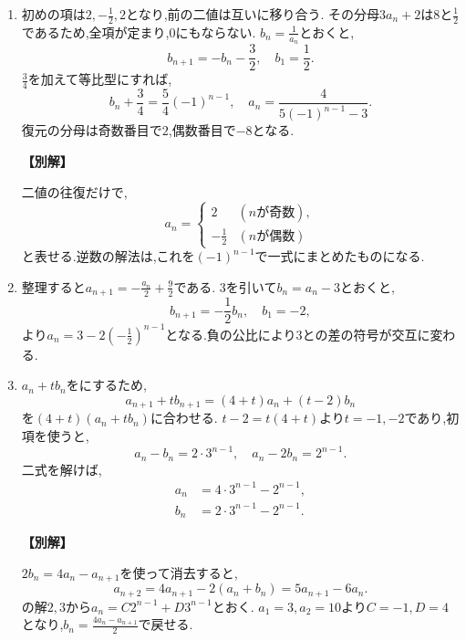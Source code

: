 \begin{enumerate}[label=\textbf{問\arabic*.},leftmargin=3.8em,format=\bookitemlink{practice-basic}{solution}{problem}]
  \item {}\BookMathLayout{}{\\}
    初めの項は$2,-\frac{1}{2},2$となり,前の二値は互いに移り合う.
    その分母$3a_n+2$は$8$と$\frac{1}{2}$であるため,全項が定まり,$0$にもならない.
    $b_n=\frac{1}{a_n}$とおくと,
    \[
      b_{n+1}=-b_n-\frac32,\quad b_1=\frac12.
    \]
    $\frac{3}{4}$を加えて等比型にすれば,
    \[
      b_n+\frac34=\frac54(-1)^{n-1},\quad
      a_n=\frac4{5(-1)^{n-1}-3}.
    \]
    復元の分母は奇数番目で$2$,偶数番目で$-8$となる.
    \par\smallskip\noindent\textbf{【別解】}\par
    二値の往復だけで,
    \[
      a_n=\begin{cases}
        2&(n\text{が奇数}),\\
        -\frac{1}{2}&(n\text{が偶数})
      \end{cases}
    \]
    と表せる.逆数の解法は,これを$(-1)^{n-1}$で一式にまとめたものになる.

  \item {}\BookMathLayout{}{\\}
    整理すると$a_{n+1}=-\frac{a_n}{2}+\frac{9}{2}$である.
    $3$を引いて$b_n=a_n-3$とおくと,
    \[
      b_{n+1}=-\frac12b_n,\quad b_1=-2,
    \]
    より$a_n=3-2\left(-\frac{1}{2}\right)^{n-1}$となる.負の公比により$3$との差の符号が交互に変わる.

  \item {}\BookMathLayout{}{\\}
    $a_n+t b_n$をにするため,
    \[
      a_{n+1}+t b_{n+1}=(4+t)a_n+(t-2)b_n
    \]
    を$(4+t)(a_n+t b_n)$に合わせる.
    $t-2=t(4+t)$より$t=-1,-2$であり,初項を使うと,
    \[
      a_n-b_n=2\cdot3^{n-1},\quad a_n-2b_n=2^{n-1}.
    \]
    二式を解けば,
    \[
      \begin{aligned}
        a_n&=4\cdot3^{n-1}-2^{n-1},\\
        b_n&=2\cdot3^{n-1}-2^{n-1}.
      \end{aligned}
    \]
    \par\smallskip\noindent\textbf{【別解】}\par
    $2b_n=4a_n-a_{n+1}$を使って消去すると,
    \[
      a_{n+2}=4a_{n+1}-2(a_n+b_n)=5a_{n+1}-6a_n.
    \]
    の解$2,3$から$a_n=C2^{n-1}+D3^{n-1}$とおく.
    $a_1=3,a_2=10$より$C=-1,D=4$となり,$b_n=\frac{4a_n-a_{n+1}}{2}$で戻せる.


\end{enumerate}
